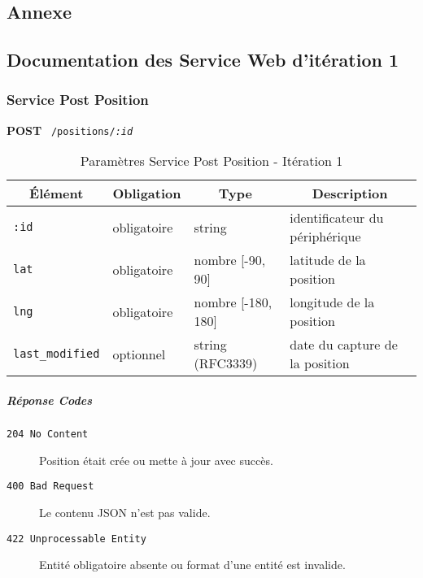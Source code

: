 \begin{appendices}
\section{Annexe}
\pagebreak

\subsection{Documentation des Service Web d'itération 1}

\subsubsection{Service Post Position}
\label{appendix:sprint1-position-post-doc}

\textbf{POST} \ \texttt{/positions/\textit{:id}}

\begin{table}[htbp]
    \centering
    \caption{Paramètres Service Post Position - Itération 1}
    \begin{tabular}{|l | l | l | l|}
        \hline
        \multicolumn{1}{|c|}{\textbf{Élément}} &
        \multicolumn{1}{c|}{\textbf{Obligation}} &
        \multicolumn{1}{c|}{\textbf{Type}} &
        \multicolumn{1}{c|}{\textbf{Description}} \\ \hline
        \verb|:id| & obligatoire & string & identificateur du périphérique \\ \hline
        \verb|lat| & obligatoire & nombre [-90, 90] & latitude de la position \\ \hline
        \verb|lng| & obligatoire & nombre [-180, 180] & longitude de la position \\ \hline
        \verb|last_modified| & optionnel & string (RFC3339) & date du capture de la position \\ \hline
    \end{tabular}
\end{table}

\subparagraph*{Réponse Codes}
\begin{description}
    \item[\texttt{204 No Content}] Position était crée ou mette à jour avec succès.
    \item[\texttt{400 Bad Request}] Le contenu JSON n'est pas valide.
    \item[\texttt{422 Unprocessable Entity}] Entité obligatoire absente ou format d'une entité est invalide.
\end{description}


\end{appendices}
